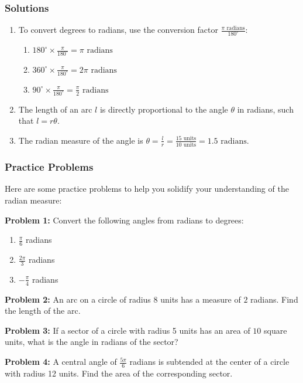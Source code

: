 \documentclass[a4paper,12pt]{book}
\newcounter{problem}
\begin{document}
\subsubsection*{Solutions}
\begin{enumerate}
  \item To convert degrees to radians, use the conversion factor \( \frac{\pi \text{ radians}}{180^\circ} \):
    \begin{enumerate}[label=\alph*.]
      \item \( 180^\circ \times \frac{\pi}{180^\circ} = \pi \text{ radians} \)
      \item \( 360^\circ \times \frac{\pi}{180^\circ} = 2\pi \text{ radians} \)
      \item \( 90^\circ \times \frac{\pi}{180^\circ} = \frac{\pi}{2} \text{ radians} \)
    \end{enumerate}
  \item The length of an arc \( l \) is directly proportional to the angle \( \theta \) in radians, such that \( l = r\theta \).
  \item The radian measure of the angle is \( \theta = \frac{l}{r} = \frac{15 \text{ units}}{10 \text{ units}} = 1.5 \text{ radians} \).
\end{enumerate}

\subsubsection*{Practice Problems}
Here are some practice problems to help you solidify your understanding of the radian measure:

\textbf{Problem 1:} Convert the following angles from radians to degrees:
\begin{enumerate}[label=\alph*.]
  \item \( \frac{\pi}{6} \) radians
  \item \( \frac{2\pi}{3} \) radians
  \item \( -\frac{\pi}{4} \) radians
\end{enumerate}

\textbf{Problem 2:} An arc on a circle of radius 8 units has a measure of \( 2 \) radians. Find the length of the arc.

\textbf{Problem 3:} If a sector of a circle with radius 5 units has an area of \( 10 \) square units, what is the angle in radians of the sector?

\textbf{Problem 4:} A central angle of \( \frac{5\pi}{6} \) radians is subtended at the center of a circle with radius 12 units. Find the area of the corresponding sector.
\end{document}
